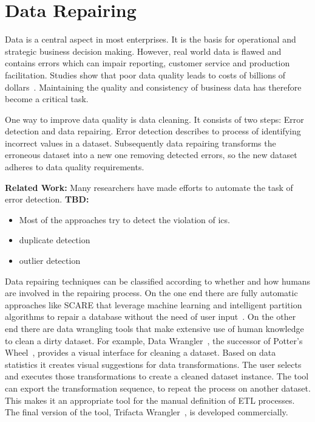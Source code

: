 
\section{Data Repairing}\label{sec:introduction}
  Data is a central aspect in most enterprises.
  It is the basis for operational and strategic business decision making.
  However, real world data is flawed and contains errors which can impair reporting, customer service and production facilitation.
  Studies show that poor data quality leads to costs of billions of dollars~\cite{Redman:quality_disaster, cost_of_low_qual}.
  Maintaining the quality and consistency of business data has therefore become a critical task.

  One way to improve data quality is data cleaning.
  It consists of two steps: Error detection and data repairing.
  Error detection describes to process of identifying incorrect values in a dataset.
  Subsequently data repairing transforms the erroneous dataset into a new one removing detected errors, so the new dataset adheres to data quality requirements.

  \bigskip
  \textbf{Related Work:}
  Many researchers have made efforts to automate the task of error detection. \textbf{TBD:}
  \begin{itemize}
    \item Most of the approaches try to detect the violation of \glspl{ic}.
    \item duplicate detection
    \item outlier detection
  \end{itemize}

  Data repairing techniques can be classified according to whether and how humans are involved in the repairing process.
  On the one end there are fully automatic approaches like SCARE that leverage machine learning and intelligent partition algorithms to repair a database without the need of user input~\cite{scare}.
  On the other end there are data wrangling tools that make extensive use of human knowledge to clean a dirty dataset.
  For example, Data Wrangler~\cite{data_wrangler}, the successor of Potter's Wheel~\cite{potters_wheel}, provides a visual interface for cleaning a dataset.
  Based on data statistics it creates visual suggestions for data transformations.
  The user selects and executes those transformations to create a cleaned dataset instance.
  The tool can export the transformation sequence, to repeat the process on another dataset.
  This makes it an appropriate tool for the manual definition of ETL processes.
  The final version of the tool, Trifacta Wrangler~\cite{trifacta_wrangler}, is developed commercially.

